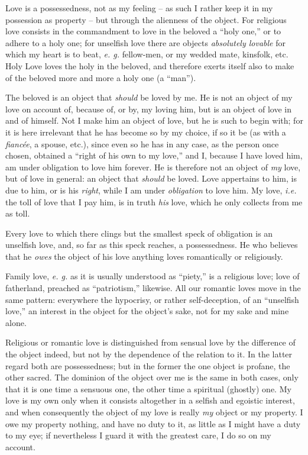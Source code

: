 \documentclass[12pt,a4paper]{book}
\begin{document}
Love is a possessedness, not as my feeling -- as such I rather keep it in my 
possession as property -- but through the alienness of the object. For 
religious love consists in the commandment to love in the beloved a ``holy 
one,'' or to adhere to a holy one; for unselfish love there are objects 
\textit{absolutely lovable} for which my heart is to beat, \textit{e. g.} 
fellow-men, or my wedded mate, kinsfolk, etc. Holy Love loves the holy in the 
beloved, and therefore exerts itself also to make of the beloved more and more 
a holy one (a ``man'').

The beloved is an object that \textit{should} be loved by me. He is not an 
object of my love on account of, because of, or by, my loving him, but is an 
object of love in and of himself. Not I make him an object of love, but he is 
such to begin with; for it is here irrelevant that he has become so by my 
choice, if so it be (as with a \textit{fianc\'ee}, a spouse, etc.), since even 
so he has in any case, as the person once chosen, obtained a ``right of his 
own to my love,'' and I, because I have loved him, am under obligation to 
love him forever. He is therefore not an object of \textit{my} love, but of 
love in general: an object that \textit{should} be loved. Love appertains to 
him, is due to him, or is his \textit{right}, while I am under 
\textit{obligation} to love him. My love, \textit{i.e.} the toll of love that 
I pay him, is in truth \textit{his} love, which he only collects from me as 
toll.

Every love to which there clings but the smallest speck of obligation is an 
unselfish love, and, so far as this speck reaches, a possessedness. He who 
believes that he \textit{owes} the object of his love anything loves 
romantically or religiously.

Family love, \textit{e. g.} as it is usually understood as ``piety,'' is a 
religious love; love of fatherland, preached as ``patriotism,'' likewise. 
All our romantic loves move in the same pattern: everywhere the hypocrisy, or 
rather self-deception, of an ``unselfish love,'' an interest in the object 
for the object's sake, not for my sake and mine alone.

Religious or romantic love is distinguished from sensual love by the 
difference of the object indeed, but not by the dependence of the relation to 
it. In the latter regard both are possessedness; but in the former the one 
object is profane, the other sacred. The dominion of the object over me is the 
same in both cases, only that it is one time a sensuous one, the other time a 
spiritual (ghostly) one. My love is my own only when it consists altogether in 
a selfish and egoistic interest, and when consequently the object of my love 
is really \textit{my} object or my property. I owe my property nothing, and 
have no duty to it, as little as I might have a duty to my eye; if 
nevertheless I guard it with the greatest care, I do so on my account.
\end{document}
